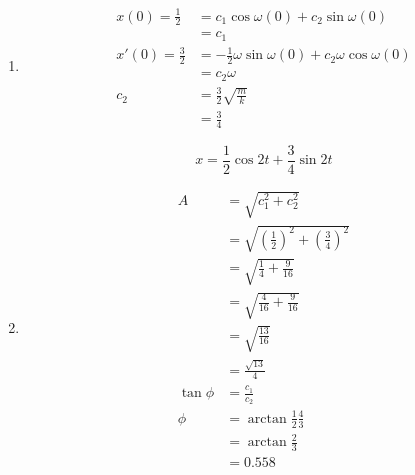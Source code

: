 \documentclass{article}
\begin{document}
\begin{enumerate}
  \item

        \begin{align*}
          x(0) = \frac{1}{2}  & = c_1 \cos \omega (0) + c_2 \sin \omega (0)                        \\
                              & = c_1                                                              \\
          x'(0) = \frac{3}{2} & = -\frac{1}{2} \omega \sin \omega (0) + c_2 \omega \cos \omega (0) \\
                              & = c_2 \omega                                                       \\
          c_2                 & = \frac{3}{2} \sqrt{\frac{m}{k}}                                   \\
                              & = \frac{3}{4}
        \end{align*}

        \[x = \frac{1}{2} \cos 2t + \frac{3}{4} \sin 2t\]

  \item

        \begin{align*}
          A         & = \sqrt{c_1^2 + c_2^2}                                               \\
                    & = \sqrt{\left( \frac{1}{2} \right)^2 + \left( \frac{3}{4} \right)^2} \\
                    & = \sqrt{\frac{1}{4} + \frac{9}{16}}                                  \\
                    & = \sqrt{\frac{4}{16} + \frac{9}{16}}                                 \\
                    & = \sqrt{\frac{13}{16}}                                               \\
                    & = \frac{\sqrt{13}}{4}                                                \\
          \tan \phi & = \frac{c_1}{c_2}                                                    \\
          \phi      & = \arctan \frac{1}{2} \frac{4}{3}                                    \\
                    & = \arctan \frac{2}{3}                                                \\
                    & = 0.558
        \end{align*}


\end{enumerate}
\end{document}
